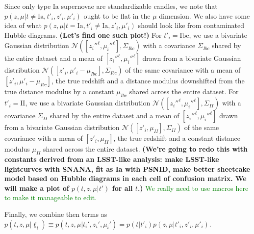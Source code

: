 \documentclass[12pt, twocolumn]{emulateapj}
\newcommand{\textul}{\underline}
\newcommand{\tkAM}[1]{\textcolor{green}{#1}}  %
\begin{document}
Since only type Ia supernovae are standardizable candles, we note that $p(z, \mu | t\neq\mathrm{Ia}, t'_{i}, z'_{i}, \mu'_{i})$ ought to be flat in the $\mu$ dimension.  
We also have some idea of what $p(z, \mu | t=\mathrm{Ia}, t'_{i}\neq\mathrm{Ia}, z'_{i}, \mu'_{i})$ should look like from contaminated Hubble diagrams.  \textbf{(Let's find one such plot!)}  
For $t'_{i}=\mathrm{Ibc}$, we use a bivariate Gaussian distribution $\mathcal{N}([z_{i}''^{\ell}, \mu_{i}''^{\ell}], \Sigma_{Ibc})$ with a covariance $\Sigma_{Ibc}$ shared by the entire dataset and a mean of $[z_{i}''^{\ell}, \mu_{i}''^{\ell}]$ drawn from a bivariate Gaussian distribution $\mathcal{N}([z'_{i}, \mu'_{i}-\mu_{Ibc}], \Sigma_{Ibc})$ of the same covariance with a mean of $[z'_{i}, \mu'_{i}-\mu_{Ibc}]$, the true redshift and a distance modulus downshifted from the true distance modulus by a constant $\mu_{Ibc}$ shared across the entire dataset.  
For $t'_{i}=\mathrm{II}$, we use a bivariate Gaussian distribution $\mathcal{N}([z_{i}''^{\ell}, \mu_{i}''^{\ell}], \Sigma_{II})$ with a covariance $\Sigma_{II}$ shared by the entire dataset and a mean of $[z_{i}''^{\ell}, \mu_{i}''^{\ell}]$ drawn from a bivariate Gaussian distribution $\mathcal{N}([z'_{i}, \mu_{II}], \Sigma_{II})$ of the same covariance with a mean of $[z'_{i}, \mu_{II}]$, the true redshift and a constant distance modulus $\mu_{II}$  shared across the entire dataset.  \textbf{(We're going to redo this with constants derived from an LSST-like analysis: make LSST-like lightcurves with SNANA, fit as Ia with PSNID, make better sheetcake model based on Hubble diagrams in each cell of confusion matrix.  We will make a plot of $p(t, z, \mu | t')$ for all $t$.)} \tkAM{We really need to use macros here to make it manageable to edit.}

Finally, we combine then terms as $p(t, z, \mu | \textul{\ell}_{i})\equiv p(t, z, \mu | t_{i}', z_{i}', \mu_{i}')=p(t | t'_{i})p(z, \mu | t'_{i}, z'_{i}, \mu'_{i})$.
\end{document}
